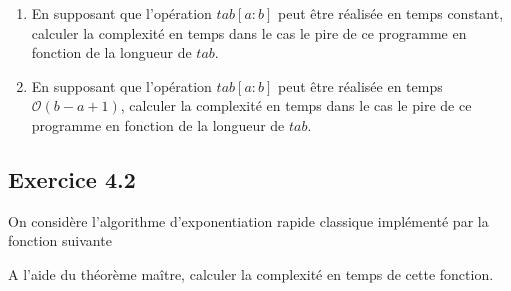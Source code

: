 \documentclass{article}[12pt]
\begin{document}
  
  \begin{enumerate}
      \item En supposant que l'opération $tab[a:b]$ peut être réalisée en temps constant, calculer la complexité en temps dans le cas le pire de ce programme en fonction de la longueur de $tab$.
      \item En supposant que l'opération $tab[a:b]$ peut être réalisée en temps $\mathcal{O}(b-a+1)$, calculer la complexité en temps dans le cas le pire de ce programme en fonction de la longueur de $tab$.
  \end{enumerate}
  
  \subsection*{Exercice 4.2}
  
  On considère l'algorithme d'exponentiation rapide classique implémenté par la fonction suivante
  
  \begin{tcolorbox}
\begin{algorithmic}[1]
        \State{}
    \EndIf
        \State{}
    \EndIf
        \State{}
    \Else
        \State{}
    \EndIf

  \EndFunction
  \end{algorithmic}
\end{tcolorbox}  
  
  A l'aide du théorème maître, calculer la complexité en temps de cette fonction.
 

  
  
\end{document}
